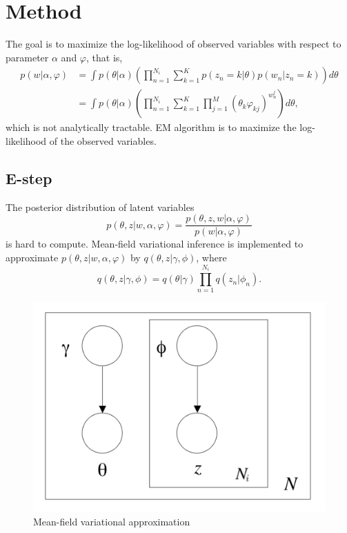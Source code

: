 \documentclass{article}
\begin{document}
\section{Method}

The goal is to maximize the log-likelihood of observed variables with respect to parameter $ \alpha $ and $ \varphi $, that is,
\begin{align*}
	p(w | \alpha, \varphi) &= \int p(\theta | \alpha) (\prod^{N_i}_{n=1} \sum^{K}_{k=1} p(z_n=k | \theta) p(w_n | z_n=k)) d\theta \\
	&= \int p(\theta | \alpha)(\prod^{N_i}_{n=1} \sum^{K}_{k=1} \prod^M_{j=1}(\theta_k \varphi_{kj})^{w_n^{j}}) d\theta,
\end{align*}
which is not analytically tractable. EM algorithm is to maximize the log-likelihood of the observed variables.

\subsection{E-step}
The posterior distribution of latent variables
\begin{equation*}
	p(\theta, z | w, \alpha, \varphi) = \frac{p(\theta, z, w | \alpha, \varphi)}{p(w | \alpha, \varphi)}
\end{equation*}
is hard to compute. Mean-field variational inference is implemented to approximate $ p(\theta, z | w, \alpha, \varphi) $ by $ q(\theta, z | \gamma, \phi) $, where
\begin{equation*}
	q(\theta, z | \gamma, \phi) = q(\theta | \gamma) \prod^{N_i}_{n=1} q(z_n | \phi_n).
\end{equation*}

\begin{figure}[htbp]
	\centering
	\includegraphics[width = 0.4\linewidth]{vi}
	\caption{Mean-field variational approximation}
	\label{figure_vi}
\end{figure}
\end{document}
